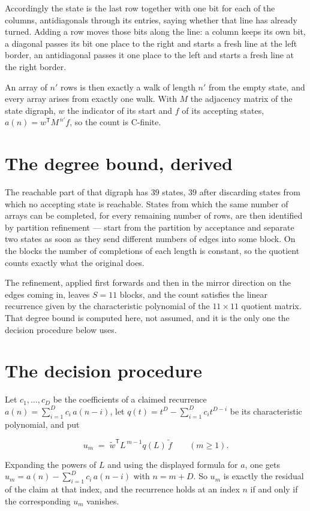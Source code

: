 \documentclass[11pt]{article}
\theoremstyle{definition}
\begin{document}
Accordingly the state is the last row together with one bit for each of the columns, antidiagonals through its entries, saying whether that line has already turned. Adding a row moves those bits along the line: a column keeps its own bit, a diagonal passes its bit one place to the right and starts a fresh line at the left border, an antidiagonal passes it one place to the left and starts a fresh line at the right border.

An array of $n'$ rows is then exactly a walk of length $n'$ from the empty state, and every array arises from exactly one walk. With $M$ the adjacency matrix of the state digraph, $w$ the indicator of its start and $f$ of its accepting states, $a(n) = w^{\mathsf T}M^{\,n'}f$, so the count is C-finite.

\section{The degree bound, derived}

The reachable part of that digraph has $39$ states, $39$ after discarding states from which no accepting state is reachable. States from which the same number of arrays can be completed, for every remaining number of rows, are then identified by partition refinement --- start from the partition by acceptance and separate two states as soon as they send different numbers of edges into some block. On the blocks the number of completions of each length is constant, so the quotient counts exactly what the original does.

The refinement, applied first forwards and then in the mirror direction on the edges coming in, leaves $S = 11$ blocks, and the count satisfies the linear recurrence given by the characteristic polynomial of the $11 \times 11$ quotient matrix. That degree bound is computed here, not assumed, and it is the only one the decision procedure below uses.

\section{The decision procedure}

Let $c_1,\dots,c_D$ be the coefficients of a claimed recurrence $a(n) = \sum_{i=1}^{D} c_i\,a(n-i)$, let $q(t) = t^{D} - \sum_{i=1}^{D} c_i t^{D-i}$ be its characteristic polynomial, and put

\[u_m \;=\; \tilde w^{\mathsf T} L^{\,m-1} q(L)\,\tilde f \qquad (m \ge 1).\]

Expanding the powers of $L$ and using the displayed formula for $a$, one gets $u_m = a(n) - \sum_{i=1}^{D} c_i\,a(n-i)$ with $n = m + D$. So $u_m$ is exactly the residual of the claim at that index, and the recurrence holds at an index $n$ if and only if the corresponding $u_m$ vanishes.
\end{document}
